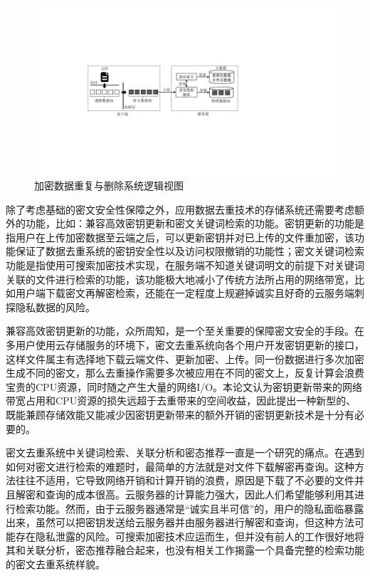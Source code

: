 \documentclass[promaster]{thesis-uestc}
\begin{document}
\begin{figure}[htbp]
    \centering
    \includegraphics[width = 1.0\linewidth]{pic/加密数据重复与删除系统逻辑图}
    \caption{加密数据重复与删除系统逻辑视图}
    \label{加密数据重复与删除系统逻辑视图}
\end{figure}

除了考虑基础的密文安全性保障之外，应用数据去重技术的存储系统还需要考虑额外的功能，比如：兼容高效密钥更新和密文关键词检索的功能。密钥更新的功能是指用户在上传加密数据至云端之后，可以更新密钥并对已上传的文件重加密，该功能保证了数据去重系统的密钥安全性以及访问权限撤销的功能性；密文关键词检索功能是指使用可搜索加密技术实现，在服务端不知道关键词明文的前提下对关键词关联的文件进行检索的功能，该功能极大地减小了传统方法所占用的网络带宽，比如用户端下载密文再解密检索，还能在一定程度上规避掉诚实且好奇的云服务端刺探隐私数据的风险。

兼容高效密钥更新的功能，众所周知，是一个至关重要的保障密文安全的手段。在多用户使用云存储服务的环境下，密文去重系统向各个用户开发密钥更新的接口，这样文件属主有选择地下载云端文件、更新加密、上传。同一份数据进行多次加密生成不同的密文，那么去重操作需要多次被应用在不同的密文上，反复计算会浪费宝贵的CPU资源，同时随之产生大量的网络I/O。本论文认为密钥更新带来的网络带宽占用和CPU资源的损失远超于去重带来的空间收益，因此提出一种新型的、既能兼顾存储效能又能减少因密钥更新带来的额外开销的密钥更新技术是十分有必要的。

密文去重系统中关键词检索、关联分析和密态推荐一直是一个研究的痛点。在遇到如何对密文进行检索的难题时，最简单的方法就是对文件下载解密再查询。这种方法往往不适用，它导致网络开销和计算开销的浪费，原因是下载了不必要的文件并且解密和查询的成本很高。云服务器的计算能力强大，因此人们希望能够利用其进行检索功能。然而，由于云服务器通常是“诚实且半可信”的，用户的隐私面临暴露出来，虽然可以把密钥发送给云服务器并由服务器进行解密和查询，但这种方法可能存在隐私泄露的风险。可搜索加密技术应运而生，但并没有前人的工作很好地将其和关联分析，密态推荐融合起来，也没有相关工作揭露一个具备完整的检索功能的密文去重系统样貌。
\end{document}
